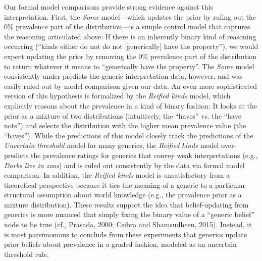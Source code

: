 \documentclass[floatsintext,man]{apa6}
\begin{document}
Our formal model comparisons provide strong evidence against this interpretation.
First, the \emph{Some} model---which updates the prior by ruling out the 0\% prevalence part of the distribution---is a simple control model that captures the reasoning articulated above: If there is an inherently binary kind of reasoning occurring (``kinds either do not do not [generically] have the property''), we would expect updating the prior by removing the 0\% prevalence part of the distribution to return whatever it means to ``generically have the property''. 
The \emph{Some} model consistently under-predicts the generic interpretation data, however, and was easily ruled out by model comparison given our data.
An even more sophisticated version of this hypothesis is formalized by the \emph{Reified kinds} model, which explicitly reasons about the prevalence in a kind of binary fashion: It looks at the prior as a mixture of two distributions (intuitively, the ``haves'' vs. the ``have nots'') and selects the distribution with the higher mean prevalence value (the ``haves'').
While the predictions of this model closely track the predictions of the \emph{Uncertain threshold} model for many generics, the \emph{Reified kinds} model over-predicts the prevalence ratings for generics that convey weak interpretations (e.g., \emph{Dorbs live in zoos}) and is ruled out consistently by the data via formal model comparison. 
In addition, the \emph{Reified kinds} model is unsatisfactory from a theoretical perspective because it ties the meaning of a generic to a particular structural assumption about world knowledge (e.g., the prevalence prior as a mixture distribution). 
These results support the idea that belief-updating from generics is more nuanced that simply fixing the binary value of a ``generic belief'' node to be true (cf., Prasada, 2000; Csibra and Shamsudheen, 2015).
Instead, it is most parsimonious to conclude from these experiments that generics update prior beliefs about prevalence in a graded fashion, modeled as an uncertain threshold rule.
%
%
\end{document}
